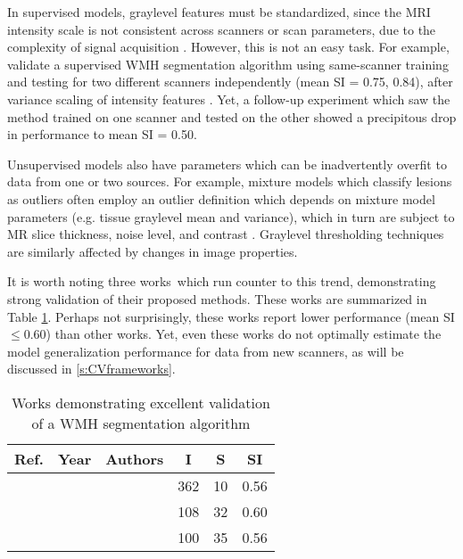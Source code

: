 \par
In supervised models, graylevel features must be standardized, since the MRI intensity scale is not consistent across scanners or scan parameters, due to the complexity of signal acquisition \cite{Nyul1999}. However, this is not an easy task. For example, \citeauthor{Steenwijk2013} validate a supervised WMH segmentation algorithm using same-scanner training and testing for two different scanners independently (mean SI = 0.75, 0.84), after variance scaling of intensity features \cite{Steenwijk2013}. Yet, a follow-up experiment which saw the method trained on one scanner and tested on the other showed a precipitous drop in performance to mean SI = 0.50. 
\par
Unsupervised models also have parameters which can be inadvertently overfit to data from one or two sources. For example, mixture models which classify lesions as outliers often employ an outlier definition which depends on mixture model parameters (e.g. tissue graylevel mean and variance), which in turn are subject to MR slice thickness, noise level, and contrast \cite{VanLeemput2001,Souplet2008,Garcia-Lorenzo2011,Roura2015}. Graylevel thresholding techniques \cite{Jack2001,Smart2011,Samaille2012,Schmidt2012,Khademi2014} are similarly affected by changes in image properties.
\par
It is worth noting three works\footnotemark\ which run counter to this trend, demonstrating strong validation of their proposed methods. These works are summarized in Table \ref{tab:priorworkval}. Perhaps not surprisingly, these works report lower performance (mean SI $\le 0.60$) than other works. Yet, even these works do not optimally estimate the model generalization performance for data from new scanners, as will be discussed in \ref{s:CVframeworks}.
\begin{table}[h]
  \newcommand{\citefortablev}[1]{{\cite{#1}}&{\citeyear{#1}}&{\citeauthor{#1}}}
  \caption{Works demonstrating excellent validation of a WMH segmentation algorithm}\label{tab:priorworkval}
  \centering
    \begin{tabular}{cclccc}
      \hline
      Ref.&Year&Authors&I&S&SI
      \\\hline
      \citefortablev{Dyrby2008} & 362 & 10 & 0.56 \\
      \citefortablev{Guizard2015} & 108 & 32 & 0.60 \\
      \citefortablev{Harmouche2015} & 100 & 35 & 0.56 \\
      \hline
    \end{tabular}
\end{table}

